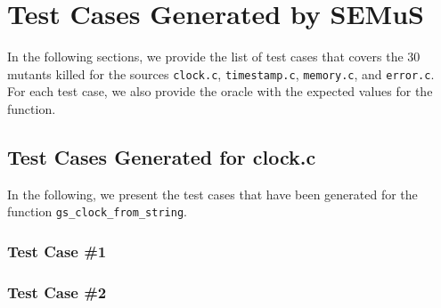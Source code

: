 
\chapter{Test Cases Generated by SEMuS}
\label{appendix}

In the following sections, we provide the list of test cases that covers the 30 mutants killed for the sources \texttt{clock.c}, \texttt{timestamp.c}, \texttt{memory.c}, and \texttt{error.c}. For each test case, we also provide the oracle with the expected values for the function. 




\section{Test Cases Generated for clock.c}

In the following, we present the test cases that have been generated for the function \texttt{gs\_clock\_from\_string}.

\subsection{Test Case \#1}


\subsection{Test Case \#2}



